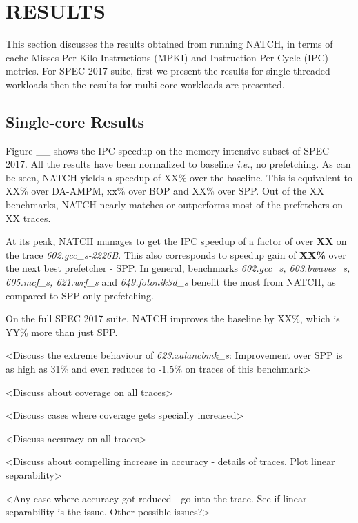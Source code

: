 
\section{RESULTS}
\label{Results}

This section discusses the results obtained from running NATCH, in
terms of cache Misses Per Kilo Instructions (MPKI) and Instruction Per
Cycle (IPC) metrics.  For SPEC 2017 suite, first we present the
results for single-threaded workloads then the results for multi-core
workloads are presented.

\subsection{Single-core Results}
\label{Results-Single}

Figure \_\_ shows the IPC speedup on the memory intensive subset of SPEC 2017. 
All the results have been normalized to baseline \textit{i.e.}, no
prefetching.  As can be seen, NATCH yields a speedup of XX\% over
the baseline.  This is equivalent to XX\% over DA-AMPM, xx\% over BOP
and XX\% over SPP.  Out of the XX benchmarks, NATCH nearly matches
or outperforms most of the prefetchers on XX traces.

At its peak, NATCH manages to get the IPC speedup of a factor of
over \textbf{XX} on the trace \textit{602.gcc\_s-2226B}.  This also
corresponds to speedup gain of \textbf{XX\%} over the next best
prefetcher - SPP.  In general, benchmarks \textit{602.gcc\_s,
  603.bwaves\_s, 605.mcf\_s, 621.wrf\_s} and \textit{649.fotonik3d\_s}
benefit the most from NATCH, as compared to SPP only prefetching.

On the full SPEC 2017 suite, NATCH improves the baseline by XX\%,
which is YY\% more than just SPP.

<Discuss the extreme behaviour of \textit{623.xalancbmk\_s}:
Improvement over SPP is as high as 31\% and even reduces to -1.5\% on
traces of this benchmark>

<Discuss about coverage on all traces>

<Discuss cases where coverage gets specially increased>

<Discuss accuracy on all traces>

<Discuss about compelling increase in accuracy - details of
traces. Plot linear separability>

<Any case where accuracy got reduced - go into the trace. See if
linear separability is the issue. Other possible issues?>


